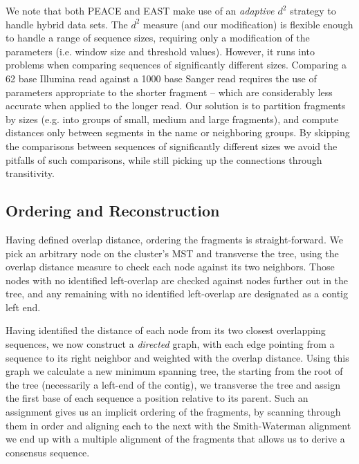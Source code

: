\documentclass[10pt]{bmc_article}
\newcommand{\peace} {{\small PEACE}}
\newcommand{\east} {{\small EAST}}
\newenvironment{bmcformat}{\begin{raggedright}\baselineskip20pt\sloppy\setboolean{publ}{false}}{\end{raggedright}\baselineskip20pt\sloppy}
\begin{document}
\begin{bmcformat}
We note that both \peace\/ and \east\/ make use of an {\it adaptive
  $d^2$} strategy to handle hybrid data sets.  The $d^2$ measure (and
our modification) is flexible enough to handle a range of sequence
sizes, requiring only a modification of the parameters (i.e. window
size and threshold values).  However, it runs into problems when
comparing sequences of significantly different sizes.  Comparing a 62
base Illumina read against a 1000 base Sanger read requires the use of
parameters appropriate to the shorter fragment -- which are
considerably less accurate when applied to the longer read.  Our
solution is to partition fragments by sizes (e.g. into groups of
small, medium and large fragments), and compute distances only
between segments in the name or neighboring groups.  By skipping the
comparisons between sequences of significantly different sizes we
avoid the pitfalls of such comparisons, while still picking up the
connections through transitivity.

\subsection*{Ordering and Reconstruction}

Having defined overlap distance, ordering the fragments is
straight-forward.  We pick an arbitrary node on the cluster's MST and
transverse the tree, using the overlap distance measure to check each
node against its two neighbors.  Those nodes with no identified
left-overlap are checked against nodes further out in the tree, and
any remaining with no identified left-overlap are designated as a contig
left end.

Having identified the distance of each node from its two closest
overlapping sequences, we now construct a {\it directed} graph, with
each edge pointing from a sequence to its right neighbor and weighted
with the overlap distance.  Using this graph we calculate a new
minimum spanning tree, the starting from the root of the tree
(necessarily a left-end of the contig), we transverse the tree and
assign the first base of each sequence a position relative to its
parent.  Such an assignment gives us an implicit ordering of the
fragments, by scanning through them in order and aligning each to
the next with the Smith-Waterman alignment we end up with a multiple
alignment of the fragments that allows us to derive a consensus
sequence.







\end{bmcformat}
\end{document}
